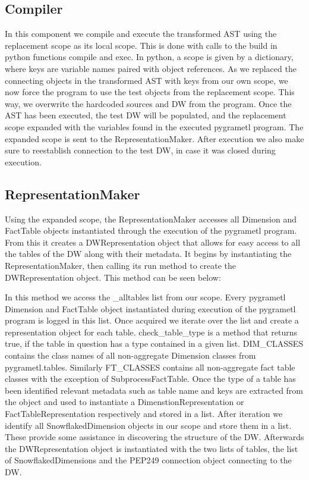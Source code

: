 \subsection{Compiler}
In this component we compile and execute the transformed AST using the replacement scope as its local scope. This is done with calls to the build in python functions compile and exec. In python, a scope is given by a dictionary, where keys are variable names paired with object references. As we replaced the connecting objects in the transformed AST with keys from our own scope, we now force the program to use the test objects from the replacement scope. This way, we overwrite the hardcoded sources and DW from the program. Once the AST has been executed, the test DW will be populated, and the replacement scope expanded with the variables found in the executed pygrametl program. The expanded scope is sent to the RepresentationMaker. After execution we also make sure to reestablish connection to the test DW, in case it was closed during execution.

\subsection{RepresentationMaker}\label{ssec:Representation}
Using the expanded scope, the RepresentationMaker accesses all Dimension and FactTable objects instantiated through the execution of the pygrametl program. From this it creates a DWRepresentation object that allows for easy access to all the tables of the DW along with their metadata. It begins by instantiating the RepresentationMaker, then calling its run method to create the DWRepresentation object. This method can be seen below:


In this method we access the \_alltables list from our scope. Every pygrametl Dimension and FactTable object instantiated during execution of the pygrametl program is logged in this list. Once acquired we iterate over the list and create a representation object for each table. check\_table\_type is a method that returns true, if the table in question has a type contained in a given list. DIM\_CLASSES contains the class names of all non-aggregate Dimension classes from pygrametl.tables. Similarly FT\_CLASSES contains all non-aggregate fact table classes with the exception of SubprocessFactTable. Once the type of a table has been identified relevant metadata such as table name and keys are extracted from the object and used to instantiate a DimenstionRepresentation or FactTableRepresentation respectively and stored in a list. After iteration we identify all SnowflakedDimension objects in our scope and store them in a list. These provide some assistance in discovering the structure of the DW. Afterwards the DWRepresentation object is instantiated with the two lists of tables, the list of SnowflakedDimensions and the PEP249 connection object connecting to the DW.


